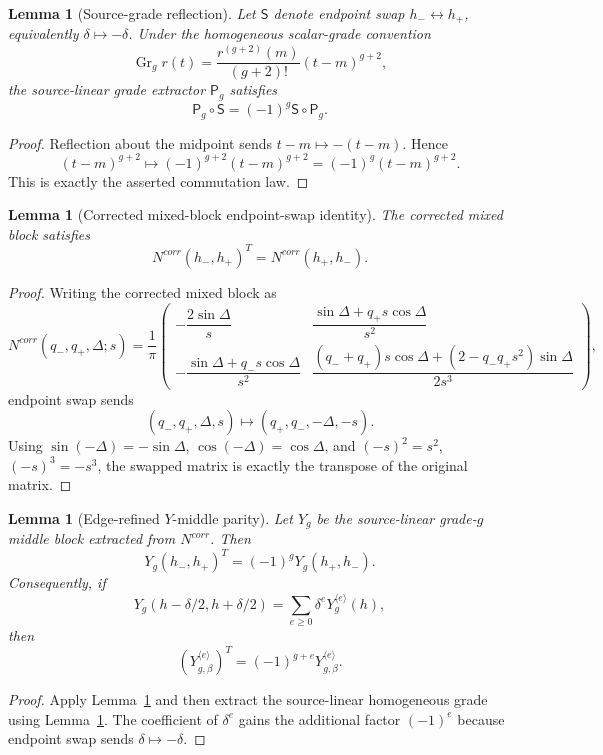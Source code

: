 \documentclass[11pt,a4paper]{amsart}
\def\corr{corr}%
\theoremstyle{plain}
\newtheorem{lemma}[theorem]{Lemma}
\theoremstyle{definition}
\newcommand{\corr}{\mathrm{corr}}
\begin{document}
\begin{lemma}[Source-grade reflection]
\label{lem:source-grade-reflection}
Let \(\mathsf S\) denote endpoint swap \(h_-\leftrightarrow h_+\), equivalently
\(\delta\mapsto-\delta\).  Under the homogeneous scalar-grade convention
\[
\operatorname{Gr}_g r(t)
=
\frac{r^{(g+2)}(m)}{(g+2)!}(t-m)^{g+2},
\]
the source-linear grade extractor \(\mathsf P_g\) satisfies
\[
\mathsf P_g\circ\mathsf S
=
(-1)^g\mathsf S\circ\mathsf P_g.
\]
\end{lemma}

\begin{proof}
Reflection about the midpoint sends \(t-m\mapsto-(t-m)\).  Hence
\[
(t-m)^{g+2}\mapsto(-1)^{g+2}(t-m)^{g+2}=(-1)^g(t-m)^{g+2}.
\]
This is exactly the asserted commutation law.
\end{proof}

\begin{lemma}[Corrected mixed-block endpoint-swap identity]
\label{lem:corr-mixed-block-endpoint-swap}
The corrected mixed block satisfies
\[
N^{\corr}(h_-,h_+)^T=N^{\corr}(h_+,h_-).
\]
\end{lemma}

\begin{proof}
Writing the corrected mixed block as
\[
N^{\corr}(q_-,q_+,\Delta;s)
=
\frac1\pi
\begin{pmatrix}
-\dfrac{2\sin\Delta}{s}
&
\dfrac{\sin\Delta+q_+s\cos\Delta}{s^2}
\\[2ex]
-\dfrac{\sin\Delta+q_-s\cos\Delta}{s^2}
&
\dfrac{(q_-+q_+)s\cos\Delta+(2-q_-q_+s^2)\sin\Delta}{2s^3}
\end{pmatrix},
\]
endpoint swap sends
\[
(q_-,q_+,\Delta,s)\mapsto(q_+,q_-,-\Delta,-s).
\]
Using \(\sin(-\Delta)=-\sin\Delta\), \(\cos(-\Delta)=\cos\Delta\),
and \((-s)^2=s^2\), \((-s)^3=-s^3\), the swapped matrix is exactly the
transpose of the original matrix.
\end{proof}

\begin{lemma}[Edge-refined \(Y\)-middle parity]
\label{lem:edge-refined-y-middle-parity-final}
Let \(Y_g\) be the source-linear grade-\(g\) middle block extracted from
\(N^{\corr}\).  Then
\[
Y_g(h_-,h_+)^T=(-1)^gY_g(h_+,h_-).
\]
Consequently, if
\[
Y_g(h-\delta/2,h+\delta/2)
=
\sum_{e\ge0}\delta^eY_g^{\langle e\rangle}(h),
\]
then
\[
\left(Y_{g,\beta}^{\langle e\rangle}\right)^T
=
(-1)^{g+e}Y_{g,\beta}^{\langle e\rangle}.
\]
\end{lemma}

\begin{proof}
Apply Lemma~\ref{lem:corr-mixed-block-endpoint-swap} and then extract the
source-linear homogeneous grade using Lemma~\ref{lem:source-grade-reflection}.
The coefficient of \(\delta^e\) gains the additional factor \((-1)^e\)
because endpoint swap sends \(\delta\mapsto-\delta\).
\end{proof}
\end{document}
